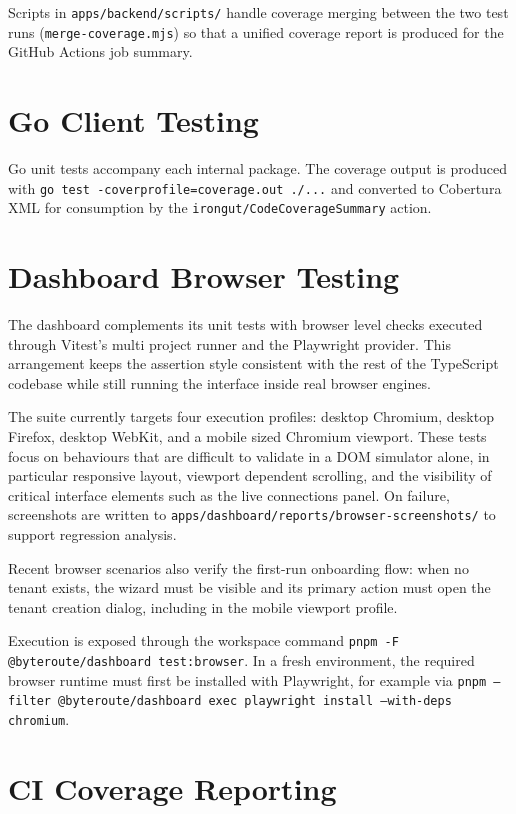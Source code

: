 \documentclass[12pt]{report}
\begin{document}
Scripts in \texttt{apps/backend/scripts/} handle coverage merging between the two test
runs (\texttt{merge-coverage.mjs}) so that a unified coverage report is produced for the
GitHub Actions job summary.

\section{Go Client Testing}

Go unit tests accompany each internal package. The coverage output is produced with
\texttt{go test -coverprofile=coverage.out ./...} and converted to Cobertura XML for
consumption by the \texttt{irongut/CodeCoverageSummary} action.

\section{Dashboard Browser Testing}

The dashboard complements its unit tests with browser level checks executed through Vitest's
multi project runner and the Playwright provider. This arrangement keeps the assertion style
consistent with the rest of the TypeScript codebase while still running the interface inside
real browser engines.

The suite currently targets four execution profiles: desktop Chromium, desktop Firefox,
desktop WebKit, and a mobile sized Chromium viewport. These tests focus on behaviours that
are difficult to validate in a DOM simulator alone, in particular responsive layout,
viewport dependent scrolling, and the visibility of critical interface elements such as the
live connections panel. On failure, screenshots are written to
\texttt{apps/dashboard/reports/browser-screenshots/} to support regression analysis.

Recent browser scenarios also verify the first-run onboarding flow: when no tenant exists,
the wizard must be visible and its primary action must open the tenant creation dialog,
including in the mobile viewport profile.

Execution is exposed through the workspace command
\texttt{pnpm -F @byteroute/dashboard test:browser}. In a fresh environment, the required
browser runtime must first be installed with Playwright, for example via
\texttt{pnpm --filter @byteroute/dashboard exec playwright install --with-deps chromium}.

\section{CI Coverage Reporting}
\end{document}
